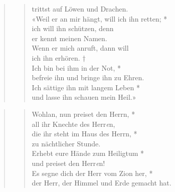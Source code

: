\begin{quote}
\begin{verse}
trittst auf Löwen und Drachen.\\
\vin «Weil er an mir hängt, will ich ihn retten; *\\
\vin ich will ihn schützen, denn \\ \vin  er kennt meinen Namen.\\
 Wenn er mich anruft, dann will \\ ich ihn erhören. †\\
 Ich bin bei ihm in der Not, *\\
befreie ihn und bringe ihn zu Ehren.\\
\vin Ich sättige ihn mit langem Leben *\\
\vin  und lasse ihn schauen mein Heil.»\\


\end{verse}

\end{quote}


\begin{quote}
 


\begin{verse}

Wohlan, nun preiset den Herrn, *\\
all ihr Knechte des Herr\textit{e}n, \\
\vin die ihr steht im Haus des Herrn, * \\
\vin zu nächtlicher Stunde. \\
Erhebt eure Hände zum Heiligtum *\\
und preiset den Herr\textit{e}n!\\
\vin Es segne dich der Herr vom Zion her, *\\
\vin der Herr, der Himmel und Erde gemacht hat. \\

\end{verse}

\end{quote}